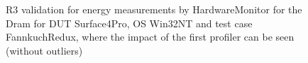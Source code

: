 \begin{figure}
                            \caption{R3 validation for energy measurements by HardwareMonitor for the Dram for DUT Surface4Pro, OS Win32NT and test case FannkuchRedux, where the impact of the first profiler can be seen (without outliers)} \label{fig:Surface4Pro_HardwareMonitor_Dram_R3_energy_without_outliers_Win32NT_avg_watts}
                            \end{figure}
                            